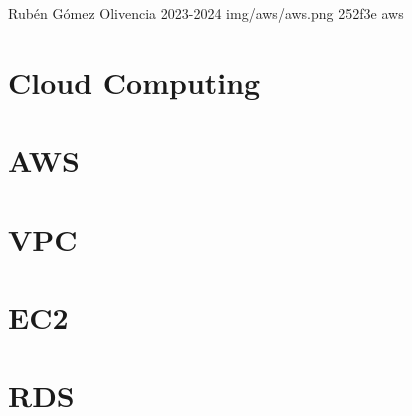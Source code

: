 \documentclass{\ClassPath/yukibook}
\begin{document}
    {Rubén Gómez Olivencia}  %
    {2023-2024}    %
    {} %
    {} %
    {} %
    {img/aws/aws.png} %
    {252f3e}
    {aws} %

    \coverpage
    \graphicspath{{../../yukibook.cls/}}
    \licensepage

    \tableofcontents


    \part{Cloud Computing}
    
    
    \part{AWS}
    
    
    \part{VPC}
    

    \part{EC2}
    
    
    \part{RDS}
    
\end{document}
